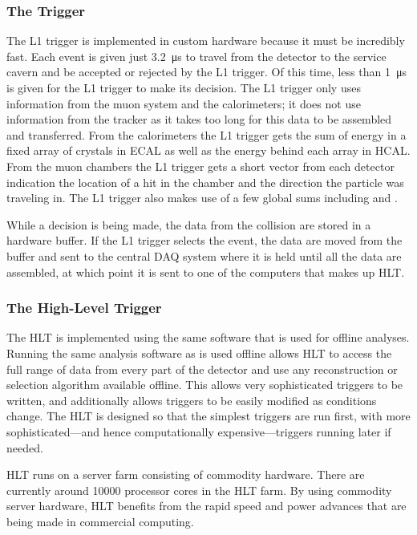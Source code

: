 \subsubsection{The \texorpdfstring{\Lone}{Level-1} Trigger}

The L1 trigger is implemented in custom hardware because it must be incredibly
fast. Each event is given just \SI{3.2}{\micro\second} to travel from the
detector to the service cavern and be accepted or rejected by the L1 trigger.
Of this time, less than \SI{1}{\micro\second} is given for the L1 trigger to
make its decision. The L1 trigger only uses information from the muon system
and the calorimeters; it does not use information from the tracker as it takes
too long for this data to be assembled and transferred. From the calorimeters
the L1 trigger gets the sum of energy in a fixed array of \fivebyfive crystals
in ECAL as well as the energy behind each array in HCAL. From the muon chambers
the L1 trigger gets a short vector from each detector indication the location
of a hit in the chamber and the direction the particle was traveling in. The L1
trigger also makes use of a few global sums including \ET and \MET.

While a decision is being made, the data from the collision are stored in a
hardware buffer. If the L1 trigger selects the event, the data are moved from
the buffer and sent to the central DAQ system where it is held until all the
data are assembled, at which point it is sent to one of the computers that makes
up HLT.

\subsubsection{The High-Level Trigger}

The HLT is implemented using the same software that is used for offline
analyses. Running the same analysis software as is used offline allows HLT to
access the full range of data from every part of the detector and use any
reconstruction or selection algorithm available offline. This allows very
sophisticated triggers to be written, and additionally allows triggers to be
easily modified as conditions change. The HLT is designed so that the simplest
triggers are run first, with more sophisticated---and hence computationally
expensive---triggers running later if needed.

HLT runs on a server farm consisting of commodity hardware. There are currently
around \num{10000} processor cores in the HLT farm. By using commodity server
hardware, HLT benefits from the rapid speed and power advances that are being
made in commercial computing.

